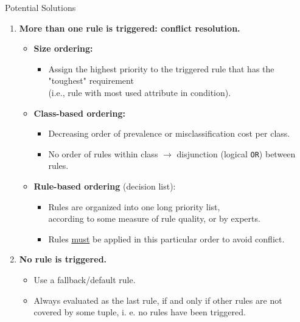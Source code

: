 \begin{frame}{Potential Solutions}
	\begin{enumerate}
		\item \textbf{More than one rule is triggered: {\color{airforceblue}conflict resolution}.}
		      \begin{itemize}
			      \item \textbf{\color{airforceblue}Size ordering:}
			            \begin{itemize}
				            \item Assign the highest priority to the triggered rule that has the "toughest" requirement \\ (i.e., rule with most used attribute in condition).
			            \end{itemize}
			      \item \textbf{\color{airforceblue}Class-based ordering:}
			            \begin{itemize}
				            \item Decreasing order of prevalence or misclassification cost per class.
				            \item No order of rules within class $\rightarrow$ disjunction (logical \texttt{OR}) between rules.
			            \end{itemize}
			      \item \textbf{\color{airforceblue}Rule-based ordering} (decision list):
			            \begin{itemize}
				            \item Rules are organized into one long priority list,\\
				                  according to some measure of rule quality, or by experts.
				            \item Rules \underline{must} be applied in this particular order to avoid conflict.
			            \end{itemize}
		      \end{itemize}
		\item \textbf{No rule is triggered.}
		      \begin{itemize}
			      \item Use a fallback/default rule.
			      \item Always evaluated as the last rule, if and only if other rules are not covered by some tuple, i. e. no rules have been triggered.
		      \end{itemize}
	\end{enumerate}
\end{frame}

